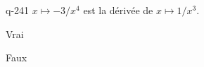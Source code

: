 \begin{truefalse}{q-241}
$x\mapsto -3/x^4$ est la dérivée de $x\mapsto 1/x^3$.
\item* Vrai
\item Faux
\end{truefalse}

